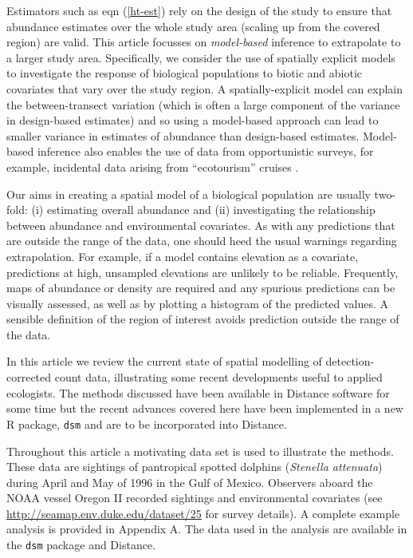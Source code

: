 \documentclass[a4paper,12pt]{article}
\begin{document}
Estimators such as eqn (\ref{ht-est}) rely on the design of the study to ensure that abundance estimates over the whole study area (scaling up from the covered region) are valid. This article focusses on \textit{model-based} inference to extrapolate to a larger study area. Specifically, we consider the use of spatially explicit models to investigate the response of biological populations to biotic and abiotic covariates that vary over the study region. A spatially-explicit model can explain the between-transect variation (which is often a large component of the variance in design-based estimates) and so using a model-based approach can lead to smaller variance in estimates of abundance than design-based estimates. Model-based inference also enables the use of data from opportunistic surveys, for example, incidental data arising from ``ecotourism'' cruises \citep{Williams:2006tz}. 

Our aims in creating a spatial model of a biological population are usually two-fold: (i) estimating overall abundance and (ii) investigating the relationship between abundance and environmental covariates. As with any predictions that are outside the range of the data, one should heed the usual warnings regarding extrapolation. For example, if a model contains elevation as a covariate, predictions at high, unsampled elevations are unlikely to be reliable. Frequently, maps of abundance or density are required and any spurious predictions can be visually assessed, as well as by plotting a histogram of the predicted values. A sensible definition of the region of interest avoids prediction outside the range of the data.

In this article we review the current state of spatial modelling of detection-corrected count data, illustrating some recent developments useful to applied ecologists. The methods discussed have been available in Distance software \citep{Thomas:2010cf} for some time but the recent advances covered here have been implemented in a new \textsf{R} package, \texttt{dsm} \citep{Miller:2013to}  and are to be incorporated into Distance.

Throughout this article a motivating data set is used to illustrate the methods. These data are sightings of pantropical spotted dolphins (\textit{Stenella attenuata}) during April and May of 1996 in the Gulf of Mexico.  Observers aboard the NOAA vessel Oregon II recorded sightings and environmental covariates (see \mbox{\url{http://seamap.env.duke.edu/dataset/25}} for survey details). A complete example analysis is provided in Appendix A. The data used in the analysis are available in the \texttt{dsm} package and Distance.
\end{document}
